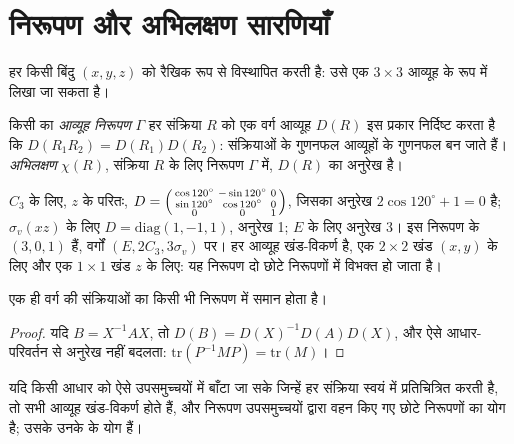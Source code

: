 \section{निरूपण और अभिलक्षण सारणियाँ}

हर  किसी बिंदु $(x, y, z)$ को रैखिक रूप से विस्थापित करती है: उसे
एक $3\times3$ आव्यूह के रूप में लिखा जा सकता है।

\begin{definition}[आव्यूह निरूपण, अभिलक्षण]\label{def:b3:point-groups:representation}
किसी  का \emph{आव्यूह निरूपण} $\Gamma$ हर
संक्रिया $R$ को एक वर्ग आव्यूह $D(R)$ इस प्रकार निर्दिष्ट करता है कि
$D(R_1R_2) = D(R_1)D(R_2)$: संक्रियाओं के गुणनफल आव्यूहों के गुणनफल बन
जाते हैं। \emph{अभिलक्षण} $\chi(R)$, संक्रिया $R$ के लिए निरूपण $\Gamma$ में,
$D(R)$ का अनुरेख है।
\end{definition}

\begin{example}[$C_{3v}$ के निर्देशांक]\label{ex:b3:point-groups:xyz}
$C_3$ के लिए, $z$ के परितः, $D = \begin{psmallmatrix}\cos120^\circ & -\sin120^\circ &
0\\ \sin120^\circ & \cos120^\circ & 0\\ 0 & 0 & 1\end{psmallmatrix}$, जिसका अनुरेख
$2\cos120^\circ + 1 = 0$ है; $\sigma_v(xz)$ के लिए $D = \mathrm{diag}(1, -1, 1)$, अनुरेख
1; $E$ के लिए अनुरेख 3। इस निरूपण के  $(3, 0, 1)$ हैं,
वर्गों $(E, 2C_3, 3\sigma_v)$ पर। हर आव्यूह खंड-विकर्ण है, एक
$2\times2$ खंड $(x, y)$ के लिए और एक $1\times1$ खंड $z$ के लिए: यह
निरूपण दो छोटे निरूपणों में विभक्त हो जाता है।
\end{example}

\begin{proposition}[अभिलक्षण वर्ग-फलन हैं]\label{prop:b3:point-groups:class-characters}
एक ही वर्ग की संक्रियाओं का  किसी भी निरूपण में समान होता है।
\end{proposition}

\begin{proof}
यदि $B = X^{-1}AX$, तो $D(B) = D(X)^{-1}D(A)D(X)$, और ऐसे आधार-परिवर्तन से
अनुरेख नहीं बदलता: $\mathrm{tr}(P^{-1}MP) = \mathrm{tr}(M)$।
\end{proof}

\begin{proposition}[खंडों द्वारा लघुकरण]\label{prop:b3:point-groups:direct-sum}
यदि किसी आधार को ऐसे उपसमुच्चयों में बाँटा जा सके जिन्हें हर संक्रिया स्वयं में
प्रतिचित्रित करती है, तो सभी आव्यूह खंड-विकर्ण होते हैं, और निरूपण उपसमुच्चयों
द्वारा वहन किए गए छोटे निरूपणों का योग है; उसके 
उनके  के योग हैं।
\end{proposition}


